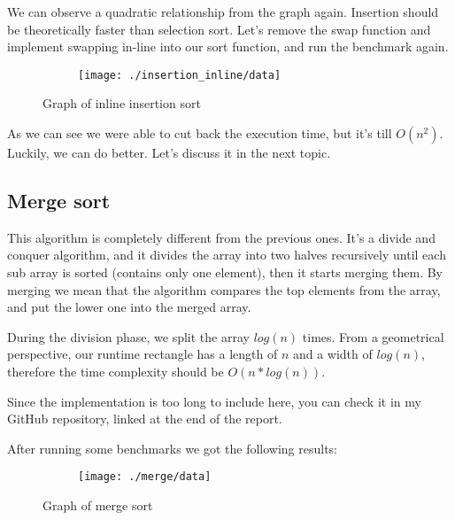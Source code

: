 \documentclass[a4paper,11pt]{article}
\begin{document}
    We can observe a quadratic relationship from the graph again.
    Insertion should be theoretically faster than selection sort.
    Let's remove the swap function and implement swapping in-line into our sort function, and run the benchmark again.

    \begin{figure}[h]
        \centering
        \begin{subfigure}[b]{.5\textwidth}
            \centering
            \texttt{[image: ./insertion\_inline/data]} %
        \end{subfigure}
        \caption{Graph of inline insertion sort}
        \label{fig:graph_3}
    \end{figure}

    As we can see we were able to cut back the execution time, but it's till $O(n^2)$.
    Luckily, we can do better.
    Let's discuss it in the next topic.

    \subsection*{Merge sort}

    This algorithm is completely different from the previous ones.
    It's a divide and conquer algorithm, and it divides the array into two halves recursively until each sub array is sorted (contains only one element), then it starts merging them.
    By merging we mean that the algorithm compares the top elements from the array, and put the lower one into the merged array.

    During the division phase, we split the array $log(n)$ times.
    From a geometrical perspective, our runtime rectangle has a length of $n$ and a width of $log(n)$, therefore the time complexity should be $O(n*log(n))$.

    Since the implementation is too long to include here, you can check it in my GitHub repository, linked at the end of the report.

    After running some benchmarks we got the following results:

    \begin{figure}[H]
        \centering
        \begin{subfigure}[b]{.5\textwidth}
            \centering
            \texttt{[image: ./merge/data]} %
        \end{subfigure}
        \caption{Graph of merge sort}
        \label{fig:graph_4}
    \end{figure}
\end{document}
